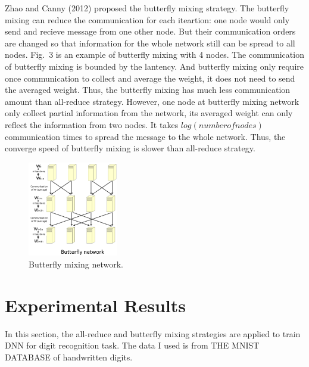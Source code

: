 \documentclass{article}
\begin{document}
Zhao and Canny (2012) proposed the butterfly mixing strategy. The butterfly mixing can reduce the communication for each iteartion: one node would only send and recieve message from one other node. But their communication orders are changed so that information for the whole network still can be spread to all nodes. Fig.~3 is an example of butterfly mixing with 4 nodes. The communication of butterfly mixing is bounded by the lantency. And butterfly mixing only require once communication to collect and average the weight, it does not need to send the averaged weight. Thus, the butterfly mixing has much less communication amount than all-reduce strategy. However, one node at butterfly mixing network only collect partial information from the network, its averaged weight can only reflect the information from two nodes. It takes $log(number of nodes)$ communication times to spread the message to the whole network. Thus, the converge speed of butterfly mixing is slower than all-reduce strategy. 
\begin{figure}[h!]
  
  \centering
    \includegraphics[width=0.35\textwidth]{butterfly.jpg}
    \caption{Butterfly mixing network.}
\end{figure}


\section{Experimental Results}
In this section, the all-reduce and butterfly mixing strategies are applied to train DNN for digit recognition task. The data I used is from THE MNIST DATABASE of handwritten digits. 
\end{document}
